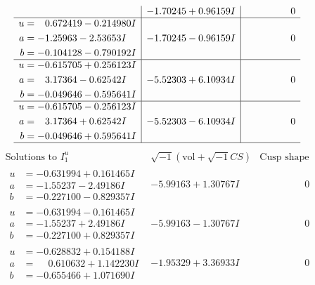 \documentclass[1p]{elsarticle_modified}
\theoremstyle{definition}
\newcommand{\I}{\sqrt{-1}}
\begin{document}
$$\begin{array}{c|c|c}
 & -1.70245 + 0.96159 I & \phantom{-0.000000 } 0 \\ \hline\begin{aligned}
u &= \phantom{-}0.672419 - 0.214980 I \\
a &= -1.25963 - 2.53653 I \\
b &= -0.104128 - 0.790192 I\end{aligned}
 & -1.70245 - 0.96159 I & \phantom{-0.000000 } 0 \\ \hline\begin{aligned}
u &= -0.615705 + 0.256123 I \\
a &= \phantom{-}3.17364 - 0.62542 I \\
b &= -0.049646 - 0.595641 I\end{aligned}
 & -5.52303 + 6.10934 I & \phantom{-0.000000 } 0 \\ \hline\begin{aligned}
u &= -0.615705 - 0.256123 I \\
a &= \phantom{-}3.17364 + 0.62542 I \\
b &= -0.049646 + 0.595641 I\end{aligned}
 & -5.52303 - 6.10934 I & \phantom{-0.000000 } 0\\
 \hline 
 \end{array}$$\newpage$$\begin{array}{c|c|c}  
\text{Solutions to }I^u_{1}& \I (\text{vol} + \sqrt{-1}CS) & \text{Cusp shape}\\
 \hline 
\begin{aligned}
u &= -0.631994 + 0.161465 I \\
a &= -1.55237 - 2.49186 I \\
b &= -0.227100 - 0.829357 I\end{aligned}
 & -5.99163 + 1.30767 I & \phantom{-0.000000 } 0 \\ \hline\begin{aligned}
u &= -0.631994 - 0.161465 I \\
a &= -1.55237 + 2.49186 I \\
b &= -0.227100 + 0.829357 I\end{aligned}
 & -5.99163 - 1.30767 I & \phantom{-0.000000 } 0 \\ \hline\begin{aligned}
u &= -0.628832 + 0.154188 I \\
a &= \phantom{-}0.610632 + 1.142230 I \\
b &= -0.655466 + 1.071690 I\end{aligned}
 & -1.95329 + 3.36933 I & \phantom{-0.000000 } 0 \\ \hline\begin{aligned}

\end{aligned}
\end{array}$$
\end{document}

